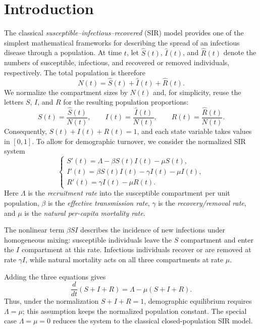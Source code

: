 \documentclass[00-main.tex]{subfiles}
\begin{document}
\section{Introduction}
The classical \textit{susceptible--infectious--recovered} (SIR) model provides one of the simplest mathematical frameworks for describing the spread of an infectious disease through a population. At time $t$, let $\widehat S(t)$, $\widehat I(t)$, and $\widehat R(t)$ denote the numbers of susceptible, infectious, and recovered or removed individuals, respectively. The total population is therefore
\[
    N(t)=\widehat S(t)+\widehat I(t)+\widehat R(t).
\]
We normalize the compartment sizes by $N(t)$ and, for simplicity, reuse the letters $S$, $I$, and $R$ for the resulting population proportions:
\[
    S(t)=\frac{\widehat S(t)}{N(t)}, \qquad
    I(t)=\frac{\widehat I(t)}{N(t)}, \qquad
    R(t)=\frac{\widehat R(t)}{N(t)}.
\]
Consequently, $S(t)+I(t)+R(t)=1$, and each state variable takes values in $[0,1]$.
To allow for demographic turnover, we consider the normalized SIR system
\[
\begin{cases}
		S'(t) = \Lambda - \beta S(t)I(t) - \mu S(t), \\
		I'(t) = \beta S(t)I(t) - \gamma I(t) - \mu I(t), \\
		R'(t) = \gamma I(t) - \mu R(t).
\end{cases}
\]
Here $\Lambda$ is the \textit{recruitment rate} into the susceptible compartment per unit population, $\beta$ is the \textit{effective transmission rate}, $\gamma$ is the \textit{recovery/removal rate}, and $\mu$ is the \textit{natural per-capita mortality rate}.

The nonlinear term $\beta SI$ describes the incidence of new infections under homogeneous mixing: susceptible individuals leave the $S$ compartment and enter the $I$ compartment at this rate.
Infectious individuals recover or are removed at rate $\gamma I$, while natural mortality acts on all three compartments at rate $\mu$.

Adding the three equations gives
\[
    \frac{d}{dt}(S+I+R)=\Lambda-\mu(S+I+R).
\]
Thus, under the normalization $S+I+R=1$, demographic equilibrium requires $\Lambda=\mu$; this assumption keeps the normalized population constant.
The special case $\Lambda=\mu=0$ reduces the system to the classical closed-population SIR model.
\end{document}
